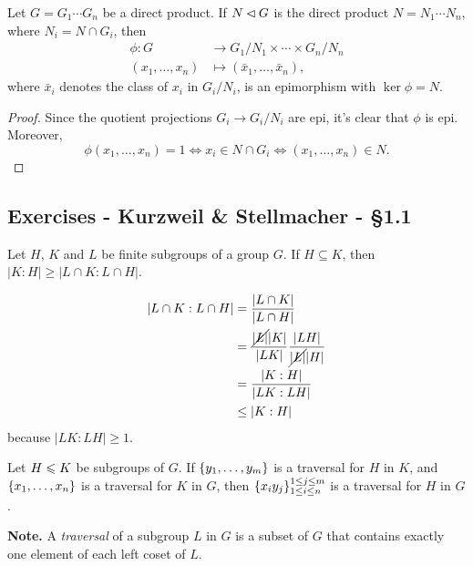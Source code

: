 \begin{prop}\label{quotient-of-products}
    Let\/ $G=G_1\cdots G_n$ be a direct product. If\/ $N\lhd G$ is the direct product\/ $N=N_1\cdots N_n$, where\/ $N_i=N\cap G_i$, then
    \begin{align*}
        \phi\colon G&\to G_1/N_1\times\cdots\times G_n/N_n\\
            (x_1,\dots,x_n)&\mapsto (\bar x_1,\dots,\bar x_n),
    \end{align*}
    where\/ $\bar x_i$ denotes the class of\/ $x_i$ in\/ $G_i/N_i$, is an epimorphism with $\ker\phi= N$.
\end{prop}

\begin{proof} Since the quotient projections $G_i\to G_i/N_i$ are epi, it's clear that $\phi$ is epi. Moreover,
$$
    \phi(x_1,\dots,x_n)=1\iff x_i\in N\cap G_i
        \iff (x_1,\dots,x_n)\in N.
$$
 \end{proof}

\subsection{Exercises - Kurzweil \& Stellmacher - \S 1.1}

\begin{exr}
    Let\/ $H$, $K$ and\/ $L$ be finite subgroups of a group\/ $G$. If\/ $H\subseteq K$, then\/ $|K:H|\ge|L\cap K: L\cap H|$.
\end{exr}

\begin{solution}
\begin{align*}
    |L\cap K: L\cap H| &= \frac{|L\cap K|}{|L\cap H|}\\
        &= \frac{\cancel{|L|}|K|}{|LK|}\frac{|LH|}{\cancel{|L|}|H|}\\
        &= \frac{|K:H|}{|LK:LH|}\\
        &\le |K:H|
\end{align*}
because $|LK:LH|\ge1$.
\end{solution}

\begin{exr}\label{exercise-1.1.2}
    Let\/ $H \leqslant K$ be subgroups of\/ $G$. If\/ $\{y_1, \dots, y_m\}$ is a traversal for\/ $H$ in\/ $K$, and\/ $\{x_1, \dots, x_n\}$ is a traversal for\/ $K$ in\/ $G$, then\/ $\{x_iy_j\}_{1\le i\le n}^{1\le j\le m}$ is a traversal for\/ $H$ in\/ $G$.

    \textrm{\upshape\textbf{Note.} A \textsl{traversal\/} of a subgroup $L$ in $G$ is a subset of $G$ that contains exactly one element of each left coset of $L$.}
\end{exr}

